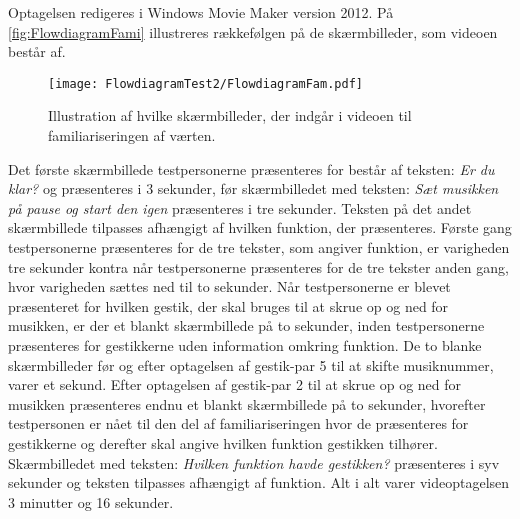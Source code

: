 Optagelsen redigeres i Windows Movie Maker version 2012. På \autoref{fig:FlowdiagramFami} illustreres rækkefølgen på de skærmbilleder, som videoen består af.      
%
\begin{figure}[H]
	\centering
	\texttt{[image: FlowdiagramTest2/FlowdiagramFam.pdf]}
	\caption{Illustration af hvilke skærmbilleder, der indgår i videoen til familiariseringen af værten.}
	\label{fig:FlowdiagramFami}
\end{figure}
\noindent
%
Det første skærmbillede testpersonerne præsenteres for består af teksten: \textit{Er du klar?} og præsenteres i 3 sekunder, før skærmbilledet med teksten: \textit{Sæt musikken på pause og start den igen} præsenteres i tre sekunder. Teksten på det andet skærmbillede tilpasses afhængigt af hvilken funktion, der præsenteres. Første gang testpersonerne præsenteres for de tre tekster, som angiver funktion, er varigheden tre sekunder kontra når testpersonerne præsenteres for de tre tekster anden gang, hvor varigheden sættes ned til to sekunder. Når testpersonerne er blevet præsenteret for hvilken gestik, der skal bruges til at skrue op og ned for musikken, er der et blankt skærmbillede på to sekunder, inden testpersonerne præsenteres for gestikkerne uden information omkring funktion. De to blanke skærmbilleder før og efter optagelsen af gestik-par 5 til at skifte musiknummer, varer et sekund. Efter optagelsen af gestik-par 2 til at skrue op og ned for musikken præsenteres endnu et blankt skærmbillede på to sekunder, hvorefter testpersonen er nået til den del af familiariseringen hvor de præsenteres for gestikkerne og derefter skal angive hvilken funktion gestikken tilhører. Skærmbilledet med teksten: \textit{Hvilken funktion havde gestikken?} præsenteres i syv sekunder og teksten tilpasses afhængigt af funktion. Alt i alt varer videoptagelsen 3 minutter og 16 sekunder. 
